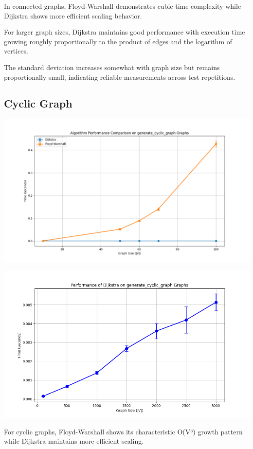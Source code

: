 \documentclass[a4paper,12pt]{article}
\begin{document}
In connected graphs, Floyd-Warshall demonstrates cubic time complexity while Dijkstra shows more efficient scaling behavior.

For larger graph sizes, Dijkstra maintains good performance with execution time growing roughly proportionally to the product of edges and the logarithm of vertices.

The standard deviation increases somewhat with graph size but remains proportionally small, indicating reliable measurements across test repetitions.
\subsection{Cyclic Graph}
\label{sec:orgb39fee6}
\begin{center}
\includegraphics[width=.9\linewidth]{dijkstra_floyd_cyclic.png}
\label{org6b43709}
\end{center}
\begin{center}
\includegraphics[width=.9\linewidth]{dijkstra_cyclic.png}
\label{org92d8b36}
\end{center}

For cyclic graphs, Floyd-Warshall shows its characteristic O(V³) growth pattern while Dijkstra maintains more efficient scaling.
\end{document}
